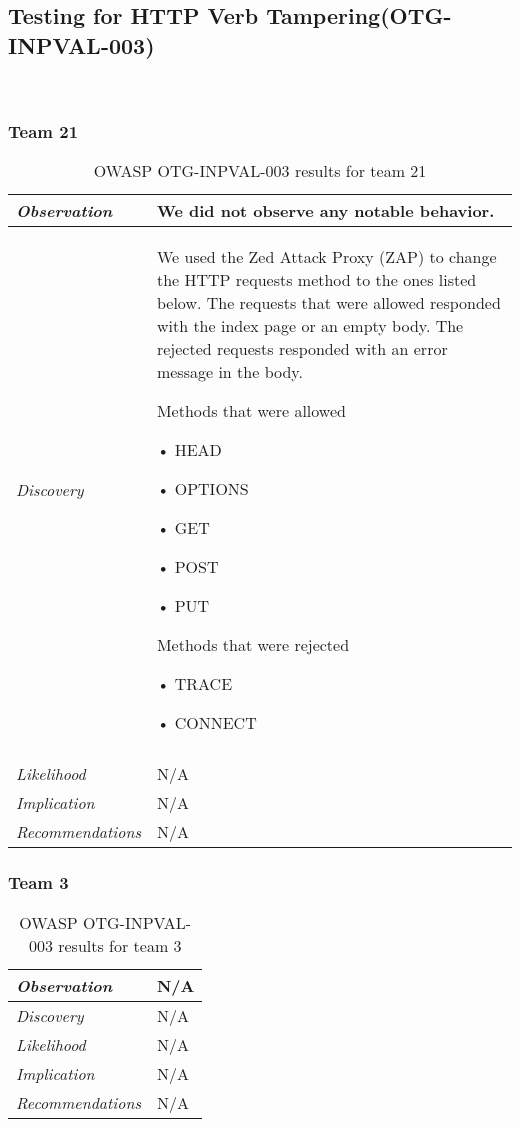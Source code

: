 \documentclass[headsepline,footsepline,footinclude=false,oneside,fontsize=11pt,paper=a4,listof=totoc,bibliography=totoc]{scrbook} %
\begin{document}
\subsection{Testing for HTTP Verb Tampering(OTG-INPVAL-003)}\

\subsubsection{Team 21}

\begin{table}[H]
	\centering
	\begin{tabular}{l p{11cm}}
		\textit{Observation} &We did not observe any notable behavior.  \\
		\hline
		\textit{Discovery} &   We used the Zed  Attack  Proxy  (ZAP)	to change the HTTP requests method to the ones listed below. The requests that were allowed responded
		with the index page or an empty body. The rejected requests responded with an
		error message in the body.\

		Methods that were allowed\

		•	HEAD\

		•	OPTIONS\

		•	GET\

		•	POST\

		•	PUT  \

		Methods that were rejected\

		•	TRACE\

		•	CONNECT  \\\\
		\hline
		\textit{Likelihood} & N/A \\
		\hline
		\textit{Implication} & N/A\\
		\hline
		\textit{Recommendations} & N/A\\
	\end{tabular}
	\caption{OWASP OTG-INPVAL-003 results for team 21}
	\label{table:scenario2}
\end{table}

\subsubsection{Team 3}

\begin{table}[H]
	\centering
	\begin{tabular}{l p{11cm}}
		\textit{Observation} &  N/A\\
		\hline
		\textit{Discovery} &  N/A \\
		\hline
		\textit{Likelihood} & N/A\\
		\hline
		\textit{Implication} & N/A\\
		\hline
		\textit{Recommendations} & N/A\\
	\end{tabular}
	\caption{OWASP OTG-INPVAL-003 results for team 3}
	\label{table:scenario2}
\end{table}
\end{document}
